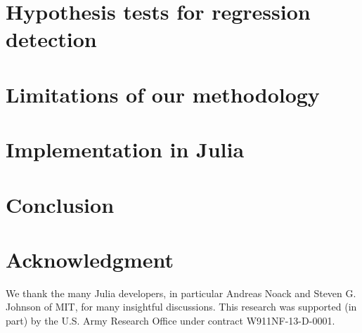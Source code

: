 \documentclass[conference]{IEEEtran}
\begin{document}
\label{sec:hypotesting}
\section{Hypothesis tests for regression detection}


\label{sec:limits}
\section{Limitations of our methodology}


\label{sec:julia}
\section{Implementation in Julia}

\label{sec:conclusion}
\section{Conclusion}

\label{sec:acknowledgement}
\section*{Acknowledgment}

We thank the many Julia developers, in particular Andreas Noack and Steven G.
Johnson of MIT, for many insightful discussions.
This research was supported (in part) by the U.S. Army Research Office under
contract W911NF-13-D-0001.




\end{document}
